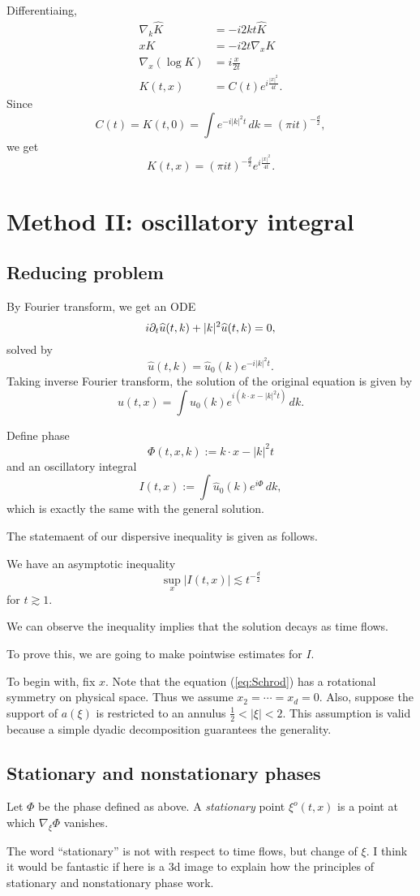 \documentclass{../exp}
\begin{document}
Differentiaing,
\begin{align*}
\nabla_k\hat{K}&=-i2kt\hat{K}\\
xK&=-i2t\nabla_xK\\
\nabla_x(\log K)&=i\frac x{2t}\\
K(t,x)&=C(t)e^{i\frac{|x|^2}{4t}}.
\end{align*}
Since
\[C(t)=K(t,0)=\int e^{-i|k|^2t}\,dk=(\pi it)^{-\frac d2},\]
we get
\[K(t,x)=(\pi it)^{-\frac d2}e^{i\frac{|x|^2}{4t}}.\]

\section{Method II: oscillatory integral}
\subsection{Reducing problem}

By Fourier transform, we get an ODE
\[i\pd_t\hat u(t,k)+|k|^2\hat u(t,k)=0,\]
solved by
\[\hat u(t,k)=\hat u_0(k)e^{-i|k|^2t}.\]
Taking inverse Fourier transform, the solution of the original equation is given by
\[u(t,x)=\int\hat u_0(k)e^{i(k\cdot x-|k|^2t)}\,dk.\]

Define phase
\[\Phi(t,x,k):=k\cdot x-|k|^2t\]
and an oscillatory integral
\[I(t,x):=\int\hat u_0(k)e^{i\Phi}\,dk,\]
which is exactly the same with the general solution.

The statemaent of our dispersive inequality is given as follows.
\begin{thm}
We have an asymptotic inequality
\[\sup_x|I(t,x)|\lesssim t^{-\frac d2}\]
for $t\gtrsim1$.
\end{thm}
We can observe the inequality implies that the solution decays as time flows.

To prove this, we are going to make pointwise estimates for $I$.


To begin with, fix $x$.
Note that the equation (\ref{eq:Schrod}) has a rotational symmetry on physical space.
Thus we assume $x_2=\cdots=x_d=0$.
Also, suppose the support of $a(\xi)$ is restricted to an annulus $\frac12<|\xi|<2$.
This assumption is valid because a simple dyadic decomposition guarantees the generality.




\subsection{Stationary and nonstationary phases}
\begin{defn}
Let $\Phi$ be the phase defined as above.
A \emph{stationary} point $\xi^o(t,x)$ is a point at which $\nabla_\xi\Phi$ vanishes.
\end{defn}
The word ``stationary'' is not with respect to time flows, but change of $\xi$.
I think it would be fantastic if here is a 3d image to explain how the principles of stationary and nonstationary phase work.
\end{document}
